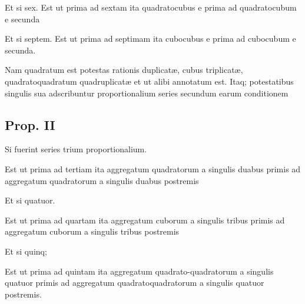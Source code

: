 \documentclass[11pt,a4paper]{article}
\begin{document}
Et si sex. Est ut prima ad sextam ita quadratocubus e prima ad quadratocubum e secunda

Et si septem. Est ut prima ad septimam ita cubocubus e prima ad cubocubum e secunda.

Nam quadratum est potestas rationis duplicatæ, cubus triplicatæ, quadratoquadratum quadruplicatæ et ut alibi annotatum est. Itaq; potestatibus singulis sua adscribuntur proportionalium series secundum earum conditionem

\subsection*{Prop. II}

Si fuerint series trium proportionalium.

Est ut prima ad tertiam ita aggregatum quadratorum a singulis duabus primis ad aggregatum quadratorum a singulis duabus postremis

Et si quatuor.

Est ut prima ad quartam ita aggregatum cuborum a singulis tribus primis ad aggregatum cuborum a singulis tribus postremis

Et si quinq;

Est ut prima ad quintam ita aggregatum quadrato-quadratorum a singulis quatuor primis ad aggregatum quadratoquadratorum a singulis quatuor postremis.
\end{document}
